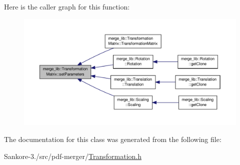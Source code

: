 Here is the caller graph for this function\-:
\nopagebreak
\begin{figure}[H]
\begin{center}
\leavevmode
\includegraphics[width=350pt]{d2/d51/classmerge__lib_1_1_transformation_matrix_a68355a7bba02700ddc35e1eff090ecf5_icgraph}
\end{center}
\end{figure}




The documentation for this class was generated from the following file\-:\begin{DoxyCompactItemize}
\item 
Sankore-\/3./src/pdf-\/merger/\hyperlink{_transformation_8h}{Transformation.\-h}\end{DoxyCompactItemize}
